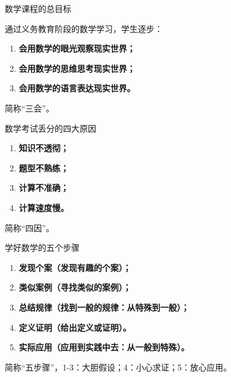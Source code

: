 \documentclass[aspectratio=169]{ctexbeamer} %
\date{\today}
\begin{document}
\begin{frame}[t]{数学课程的总目标}
\begin{spacing}{1.5} %
{\large
通过义务教育阶段的数学学习，学生逐步：
\begin{enumerate}[label={\arabic*.}]
\item \textbf{会用数学的眼光观察现实世界；}
\item \textbf{会用数学的思维思考现实世界；}
\item \textbf{会用数学的语言表达现实世界。}
\end{enumerate} 
\vspace{1cm}
\alert{简称“三会”。}
}
\end{spacing}
\end{frame}

\begin{frame}[t]{数学考试丢分的四大原因}
\begin{spacing}{1.5} %
{\large
\begin{enumerate}[label={\arabic*.}]
\item \textbf{知识不透彻；}
\item \textbf{题型不熟练；}
\item \textbf{计算不准确；}
\item \textbf{计算速度慢。} 
\end{enumerate}
\vspace{1cm}
\alert{简称“四因”。}
}
\end{spacing}
\end{frame}

\begin{frame}[t]{学好数学的五个步骤}
\begin{spacing}{1.5} %
{\large
\begin{enumerate}[label={\arabic*.}]
\item \textbf{发现个案（发现有趣的个案）；}
\item \textbf{类似案例（寻找类似的案例）；}
\item \textbf{总结规律（找到一般的规律：从特殊到一般）；}
\item \textbf{定义证明（给出定义或证明）。} 
\item \textbf{实际应用（应用到实践中去：从一般到特殊）。} 
\end{enumerate}
\vspace{1cm}
\alert{简称“五步骤”，1-3：大胆假设；4：小心求证；5：放心应用。}
}
\end{spacing}
\end{frame}
\end{document}

